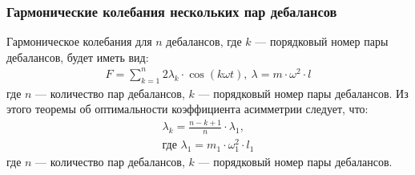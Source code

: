 \documentclass[10pt, pdf, hyperref={unicode}]{beamer}
\begin{document}
    \begin{frame}
        \frametitle{Гармонические колебания нескольких пар дебалансов}
        \begin{center}
            \begin{minipage}[h]{0.97\linewidth}
                Гармоническое колебания для $n$ дебалансов, где $k$ --- порядковый номер пары дебалансов, будет иметь вид:
                \begin{equation}\label{eq:short_harmonic_sum}
                    \begin{gathered}
                        F = \sum\limits_{k = 1}^n 2 \lambda_k \cdot \cos (k \omega t), \ \lambda = m \cdot \omega^2 \cdot l
                    \end{gathered}
                \end{equation}
                \noindent где $n$ --- количество пар дебалансов, $k$ --- порядковый номер пары дебалансов.
                Из этого теоремы об оптимальности коэффициента асимметрии следует, что:
                \begin{equation}\label{eq:opt_attitude}
                    \begin{gathered}
                        \lambda_k = \frac{n - k + 1}{n} \cdot \lambda_1,\\
                        \textrm{где } \lambda_1 = m_1 \cdot \omega_{1}^{2} \cdot l_1
                    \end{gathered}
                \end{equation}
                \noindent где $n$ --- количество пар дебалансов, $k$ --- порядковый номер пары дебалансов.
            \end{minipage}
        \end{center}
    \end{frame}
\end{document}
